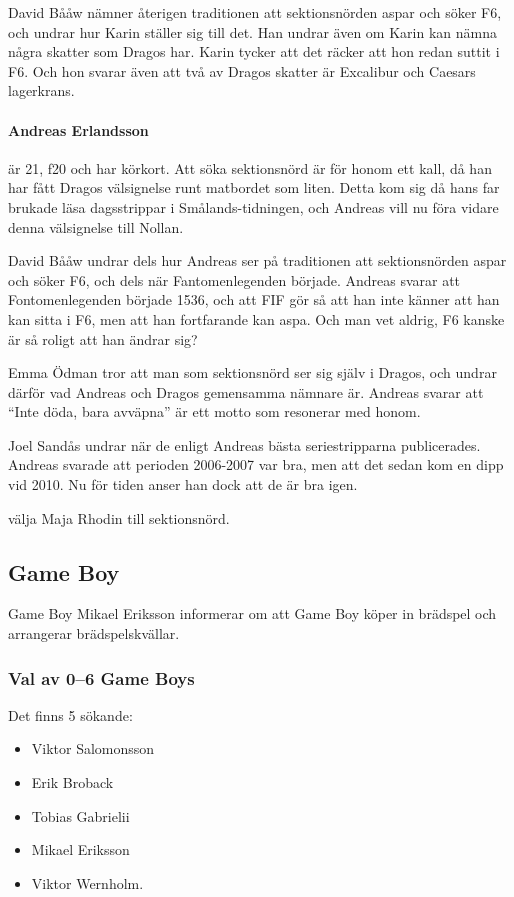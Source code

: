\documentclass[hidelinks]{sektionsmote}
\begin{document}
David Bååw nämner återigen traditionen att sektionsnörden aspar och söker F6, och undrar hur Karin ställer sig till det.
Han undrar även om Karin kan nämna några skatter som Dragos har.
Karin tycker att det räcker att hon redan suttit i F6.
Och hon svarar även att två av Dragos skatter är Excalibur och Caesars lagerkrans.

\paragraph{Andreas Erlandsson} är 21, f20 och har körkort.
Att söka sektionsnörd är för honom ett kall, då han har fått Dragos välsignelse runt matbordet som liten.
Detta kom sig då hans far brukade läsa dagsstrippar i Smålands-tidningen, och Andreas vill nu föra vidare denna välsignelse till Nollan.

David Bååw undrar dels hur Andreas ser på traditionen att sektionsnörden aspar och söker F6, och dels när Fantomenlegenden började.
Andreas svarar att Fontomenlegenden började 1536, och att FIF gör så att han inte känner att han kan sitta i F6, men att han fortfarande kan aspa.
Och man vet aldrig, F6 kanske är så roligt att han ändrar sig?

Emma Ödman tror att man som sektionsnörd ser sig själv i Dragos, och undrar därför vad Andreas och Dragos gemensamma nämnare är.
Andreas svarar att \enquote{Inte döda, bara avväpna} är ett motto som resonerar med honom.

Joel Sandås undrar när de enligt Andreas bästa seriestripparna publicerades.
Andreas svarade att perioden 2006-2007 var bra, men att det sedan kom en dipp vid 2010.
Nu för tiden anser han dock att de är bra igen.

\begin{beslut}
  \item välja Maja Rhodin till sektionsnörd.
\end{beslut}


\subsection{Game Boy}
Game Boy Mikael Eriksson informerar om att Game Boy köper in brädspel och arrangerar brädspelskvällar.

\subsubsection{Val av 0--6 Game Boys}
Det finns 5 sökande:
\begin{itemize}
    \item Viktor Salomonsson
    \item Erik Broback
    \item Tobias Gabrielii
    \item Mikael Eriksson
    \item Viktor Wernholm.
\end{itemize}
\end{document}
